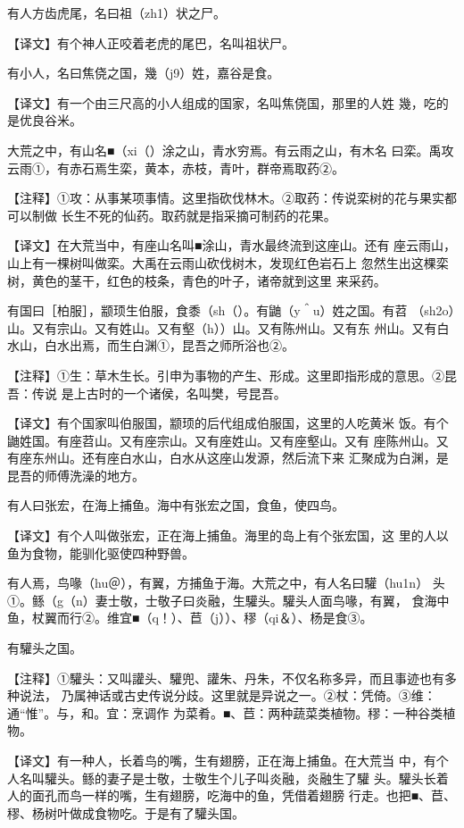 \documentclass[a4paper,12pt,UTF8,twoside]{ctexbook}
\begin{document}
有人方齿虎尾，名曰祖（zh1）状之尸。

【译文】有个神人正咬着老虎的尾巴，名叫祖状尸。

有小人，名曰焦侥之国，幾（j9）姓，嘉谷是食。

【译文】有一个由三尺高的小人组成的国家，名叫焦侥国，那里的人姓 幾，吃的是优良谷米。

大荒之中，有山名■（xi（）涂之山，青水穷焉。有云雨之山，有木名 曰栾。禹攻云雨①，有赤石焉生栾，黄本，赤枝，青叶，群帝焉取药②。

【注释】①攻：从事某项事情。这里指砍伐林木。②取药：传说栾树的花与果实都可以制做 长生不死的仙药。取药就是指采摘可制药的花果。

【译文】在大荒当中，有座山名叫■涂山，青水最终流到这座山。还有 座云雨山，山上有一棵树叫做栾。大禹在云雨山砍伐树木，发现红色岩石上 忽然生出这棵栾树，黄色的茎干，红色的枝条，青色的叶子，诸帝就到这里 来采药。

有国曰［柏服］，颛顼生伯服，食黍（sh（）。有鼬（y＾u）姓之国。有苕 （sh2o）山。又有宗山。又有姓山。又有壑（h））山。又有陈州山。又有东 州山。又有白水山，白水出焉，而生白渊①，昆吾之师所浴也②。

【注释】①生：草木生长。引申为事物的产生、形成。这里即指形成的意思。②昆吾：传说 是上古时的一个诸侯，名叫樊，号昆吾。

【译文】有个国家叫伯服国，颛顼的后代组成伯服国，这里的人吃黄米 饭。有个鼬姓国。有座苕山。又有座宗山。又有座姓山。又有座壑山。又有 座陈州山。又有座东州山。还有座白水山，白水从这座山发源，然后流下来 汇聚成为白渊，是昆吾的师傅洗澡的地方。

有人曰张宏，在海上捕鱼。海中有张宏之国，食鱼，使四鸟。

【译文】有个人叫做张宏，正在海上捕鱼。海里的岛上有个张宏国，这 里的人以鱼为食物，能驯化驱使四种野兽。

有人焉，鸟喙（hu＠），有翼，方捕鱼于海。大荒之中，有人名曰驩（hu1n） 头①。鲧（g（n）妻士敬，士敬子曰炎融，生驩头。驩头人面鸟喙，有翼， 食海中鱼，杖翼而行②。维宜■（q！）、苣（j））、穋（qi＆）、杨是食③。

有驩头之国。

【注释】①驩头：又叫讙头、驩兜、讙朱、丹朱，不仅名称多异，而且事迹也有多种说法， 乃属神话或古史传说分歧。这里就是异说之一。②杖：凭倚。③维：通“惟”。与，和。宜：烹调作 为菜肴。■、苣：两种蔬菜类植物。穋：一种谷类植物。

【译文】有一种人，长着鸟的嘴，生有翅膀，正在海上捕鱼。在大荒当 中，有个人名叫驩头。鲧的妻子是士敬，士敬生个儿子叫炎融，炎融生了驩 头。驩头长着人的面孔而鸟一样的嘴，生有翅膀，吃海中的鱼，凭借着翅膀 行走。也把■、苣、穋、杨树叶做成食物吃。于是有了驩头国。
\end{document}

